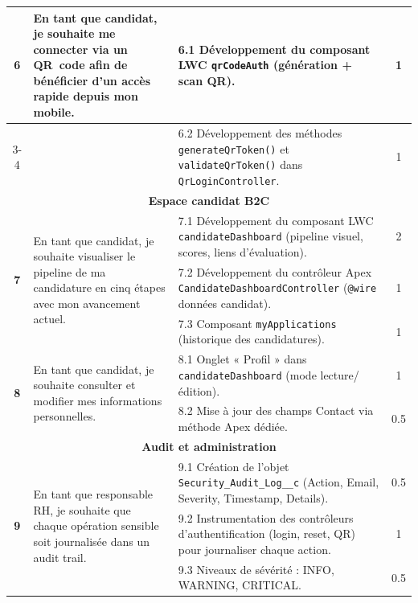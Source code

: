 \begin{longtable}{|c|p{5.5cm}|p{6cm}|c|}
\hline

\multirow{2}{*}{\textbf{6}} & \multirow{2}{5.5cm}{En tant que candidat, je souhaite me connecter via un QR~code afin de bénéficier d'un accès rapide depuis mon mobile.} & 6.1 Développement du composant LWC \texttt{qrCodeAuth} (génération + scan QR). & 1 \\
\cline{3-4}
& & 6.2 Développement des méthodes \texttt{generateQrToken()} et \texttt{validateQrToken()} dans \texttt{QrLoginController}. & 1 \\

\hline

\multicolumn{4}{|c|}{\cellcolor{orange!8}\textbf{Espace candidat B2C}} \\
\hline

\multirow{3}{*}{\textbf{7}} & \multirow{3}{5.5cm}{En tant que candidat, je souhaite visualiser le pipeline de ma candidature en cinq étapes avec mon avancement actuel.} & 7.1 Développement du composant LWC \texttt{candidateDashboard} (pipeline visuel, scores, liens d'évaluation). & 2 \\
\cline{3-4}
& & 7.2 Développement du contrôleur Apex \texttt{CandidateDashboardController} (\texttt{@wire} données candidat). & 1 \\
\cline{3-4}
& & 7.3 Composant \texttt{myApplications} (historique des candidatures). & 1 \\

\hline

\multirow{2}{*}{\textbf{8}} & \multirow{2}{5.5cm}{En tant que candidat, je souhaite consulter et modifier mes informations personnelles.} & 8.1 Onglet « Profil » dans \texttt{candidateDashboard} (mode lecture/édition). & 1 \\
\cline{3-4}
& & 8.2 Mise à jour des champs Contact via méthode Apex dédiée. & 0.5 \\

\hline

\multicolumn{4}{|c|}{\cellcolor{purple!8}\textbf{Audit et administration}} \\
\hline

\multirow{3}{*}{\textbf{9}} & \multirow{3}{5.5cm}{En tant que responsable RH, je souhaite que chaque opération sensible soit journalisée dans un audit trail.} & 9.1 Création de l'objet \texttt{Security\_Audit\_Log\_\_c} (Action, Email, Severity, Timestamp, Details). & 0.5 \\
\cline{3-4}
& & 9.2 Instrumentation des contrôleurs d'authentification (login, reset, QR) pour journaliser chaque action. & 1 \\
\cline{3-4}
& & 9.3 Niveaux de sévérité : INFO, WARNING, CRITICAL. & 0.5 \\


\end{longtable}
